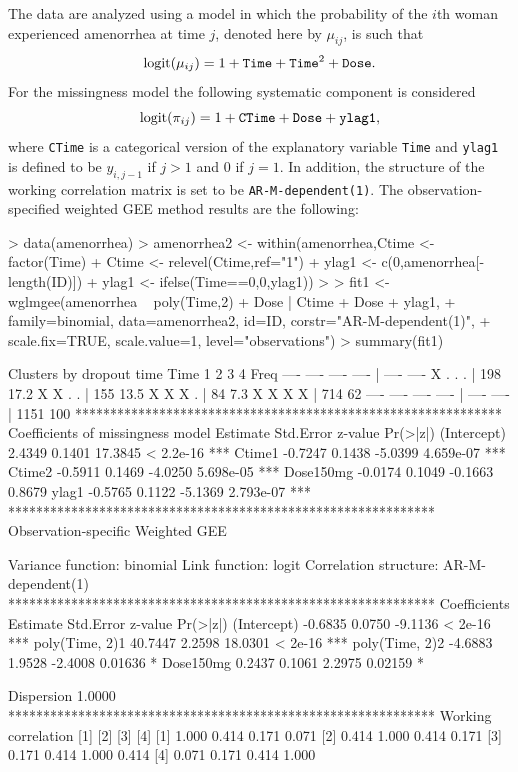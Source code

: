 The data are analyzed using a model in which the probability of the $i$th woman experienced amenorrhea
at time $j$, denoted here by $\mu_{ij}$, is such that
$${\rm logit}(\mu_{ij})=1 + {\tt Time} + {\tt Time}^2 + {\tt Dose}.$$
For the missingness model the following systematic component is considered
$${\rm logit}(\pi_{ij})=1 + {\tt CTime} + {\tt Dose} + {\tt ylag1},$$
where {\tt CTime} is a categorical version of the explanatory variable {\tt Time} and {\tt ylag1} is defined to be $y_{i,j-1}$ if
$j>1$ and 0 if $j=1$. In addition, the structure of the working correlation matrix is set to be {\tt AR-M-dependent(1)}.
The observation-specified weighted GEE method results are the following:

\begin{example}
> data(amenorrhea)
> amenorrhea2 <- within(amenorrhea,{Ctime <- factor(Time)
+                                   Ctime <- relevel(Ctime,ref="1")
+                                   ylag1 <- c(0,amenorrhea[-length(ID)])
+                                   ylag1 <- ifelse(Time==0,0,ylag1)})
>
> fit1 <- wglmgee(amenorrhea ~ poly(Time,2) + Dose | Ctime + Dose + ylag1, 
+                 family=binomial, data=amenorrhea2, id=ID, corstr="AR-M-dependent(1)",
+                 scale.fix=TRUE, scale.value=1, level="observations")
> summary(fit1)

Clusters by dropout time
 Time 1    2    3    4   Freq   %
   ---- ---- ---- ---- | ---- ----
      X    .    .    . |  198 17.2
      X    X    .    . |  155 13.5
      X    X    X    . |   84  7.3
      X    X    X    X |  714   62
   ---- ---- ---- ---- | ---- ----
                       | 1151  100
*************************************************************
Coefficients of missingness model
            Estimate Std.Error z-value  Pr(>|z|)    
(Intercept)   2.4349    0.1401 17.3845 < 2.2e-16 ***
Ctime1       -0.7247    0.1438 -5.0399 4.659e-07 ***
Ctime2       -0.5911    0.1469 -4.0250 5.698e-05 ***
Dose150mg    -0.0174    0.1049 -0.1663    0.8679    
ylag1        -0.5765    0.1122 -5.1369 2.793e-07 ***
*************************************************************
Observation-specific Weighted GEE

        Variance function:  binomial
            Link function:  logit
    Correlation structure:  AR-M-dependent(1)
*************************************************************
Coefficients
               Estimate Std.Error z-value Pr(>|z|)    
(Intercept)     -0.6835    0.0750 -9.1136  < 2e-16 ***
poly(Time, 2)1  40.7447    2.2598 18.0301  < 2e-16 ***
poly(Time, 2)2  -4.6883    1.9528 -2.4008  0.01636 *  
Dose150mg        0.2437    0.1061  2.2975  0.02159 *  
                                                      
Dispersion       1.0000                               
*************************************************************
Working correlation
     [1]   [2]   [3]   [4] 
[1] 1.000 0.414 0.171 0.071
[2] 0.414 1.000 0.414 0.171
[3] 0.171 0.414 1.000 0.414
[4] 0.071 0.171 0.414 1.000
\end{example}

